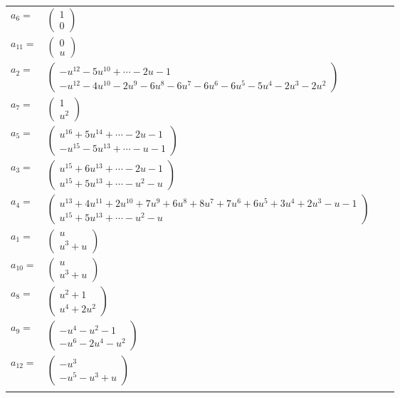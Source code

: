\documentclass[1p]{elsarticle_modified}
\theoremstyle{definition}
\begin{document}
\begin{tabular}{m{7pt} m{180pt} m{7pt} m{180pt} }
\flushright $a_{6}=$&$\begin{pmatrix}1\\0\end{pmatrix}$ \\
\flushright $a_{11}=$&$\begin{pmatrix}0\\u\end{pmatrix}$ \\
\flushright $a_{2}=$&$\begin{pmatrix}- u^{12}-5 u^{10}+\cdots-2 u-1\\- u^{12}-4 u^{10}-2 u^9-6 u^8-6 u^7-6 u^6-6 u^5-5 u^4-2 u^3-2 u^2\end{pmatrix}$ \\
\flushright $a_{7}=$&$\begin{pmatrix}1\\u^2\end{pmatrix}$ \\
\flushright $a_{5}=$&$\begin{pmatrix}u^{16}+5 u^{14}+\cdots-2 u-1\\- u^{15}-5 u^{13}+\cdots- u-1\end{pmatrix}$ \\
\flushright $a_{3}=$&$\begin{pmatrix}u^{15}+6 u^{13}+\cdots-2 u-1\\u^{15}+5 u^{13}+\cdots- u^2- u\end{pmatrix}$ \\
\flushright $a_{4}=$&$\begin{pmatrix}u^{13}+4 u^{11}+2 u^{10}+7 u^9+6 u^8+8 u^7+7 u^6+6 u^5+3 u^4+2 u^3- u-1\\u^{15}+5 u^{13}+\cdots- u^2- u\end{pmatrix}$ \\
\flushright $a_{1}=$&$\begin{pmatrix}u\\u^3+u\end{pmatrix}$ \\
\flushright $a_{10}=$&$\begin{pmatrix}u\\u^3+u\end{pmatrix}$ \\
\flushright $a_{8}=$&$\begin{pmatrix}u^2+1\\u^4+2 u^2\end{pmatrix}$ \\
\flushright $a_{9}=$&$\begin{pmatrix}- u^4- u^2-1\\- u^6-2 u^4- u^2\end{pmatrix}$ \\
\flushright $a_{12}=$&$\begin{pmatrix}- u^3\\- u^5- u^3+u\end{pmatrix}$\\&\end{tabular}
\end{document}
